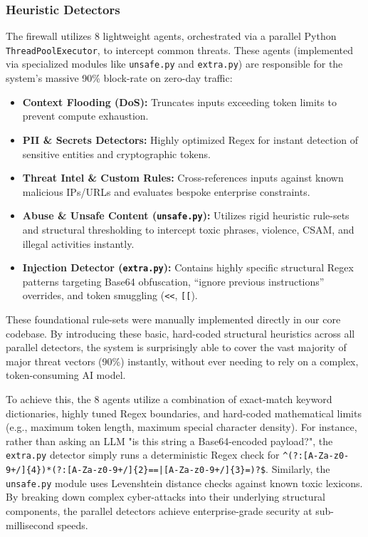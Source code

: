 \documentclass[12pt,a4paper]{article}
\begin{document}
\subsubsection{Heuristic Detectors}
The firewall utilizes 8 lightweight agents, orchestrated via a parallel Python \texttt{ThreadPoolExecutor}, to intercept common threats. These agents (implemented via specialized modules like \texttt{unsafe.py} and \texttt{extra.py}) are responsible for the system's massive 90\% block-rate on zero-day traffic:
\begin{itemize}
    \item \textbf{Context Flooding (DoS):} Truncates inputs exceeding token limits to prevent compute exhaustion.
    \item \textbf{PII \& Secrets Detectors:} Highly optimized Regex for instant detection of sensitive entities and cryptographic tokens.
    \item \textbf{Threat Intel \& Custom Rules:} Cross-references inputs against known malicious IPs/URLs and evaluates bespoke enterprise constraints.
    \item \textbf{Abuse \& Unsafe Content (\texttt{unsafe.py}):} Utilizes rigid heuristic rule-sets and structural thresholding to intercept toxic phrases, violence, CSAM, and illegal activities instantly.
    \item \textbf{Injection Detector (\texttt{extra.py}):} Contains highly specific structural Regex patterns targeting Base64 obfuscation, ``ignore previous instructions'' overrides, and token smuggling (\texttt{<<}, \texttt{[[}).
\end{itemize}

These foundational rule-sets were manually implemented directly in our core codebase. By introducing these basic, hard-coded structural heuristics across all parallel detectors, the system is surprisingly able to cover the vast majority of major threat vectors (90\%) instantly, without ever needing to rely on a complex, token-consuming AI model. 

To achieve this, the 8 agents utilize a combination of exact-match keyword dictionaries, highly tuned Regex boundaries, and hard-coded mathematical limits (e.g., maximum token length, maximum special character density). For instance, rather than asking an LLM "is this string a Base64-encoded payload?", the \texttt{extra.py} detector simply runs a deterministic Regex check for \texttt{\textasciicircum(?:[A-Za-z0-9+/]\{4\})*(?:[A-Za-z0-9+/]\{2\}==|[A-Za-z0-9+/]\{3\}=)?\$}. Similarly, the \texttt{unsafe.py} module uses Levenshtein distance checks against known toxic lexicons. By breaking down complex cyber-attacks into their underlying structural components, the parallel detectors achieve enterprise-grade security at sub-millisecond speeds.
\end{document}
